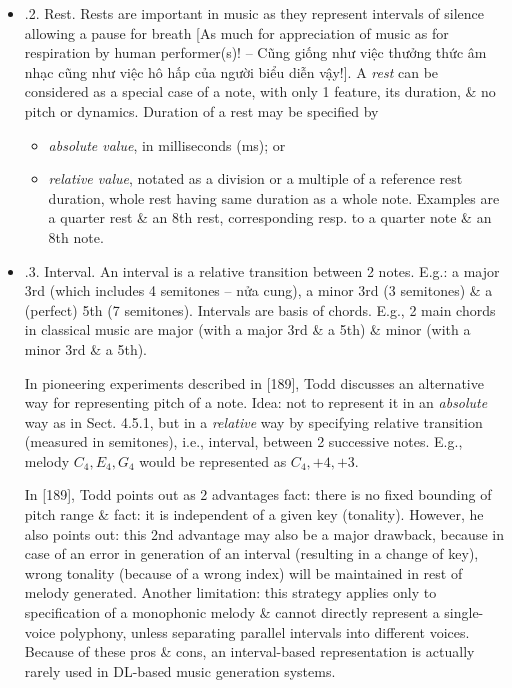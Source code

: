 \documentclass{article}
\begin{document}
\begin{itemize}
\begin{itemize}
\begin{itemize}
\begin{itemize}
\begin{enumerate}
				\end{enumerate}
			\end{itemize}
			\item {.2. Rest.} Rests are important in music as they represent intervals of silence allowing a pause for breath [As much for appreciation of music as for respiration by human performer(s)! -- Cũng giống như việc thưởng thức âm nhạc cũng như việc hô hấp của người biểu diễn vậy!]. A {\it rest} can be considered as a special case of a note, with only 1 feature, its duration, \& no pitch or dynamics. Duration of a rest may be specified by
			\begin{itemize}
				\item {\it absolute value}, in milliseconds (ms); or
				\item {\it relative value}, notated as a division or a multiple of a reference rest duration, whole rest having same duration as a whole note. Examples are a quarter rest \& an 8th rest, corresponding resp. to a quarter note \& an 8th note.
			\end{itemize}
			\item {.3. Interval.} An interval is a relative transition between 2 notes. E.g.: a major 3rd (which includes 4 semitones -- nửa cung), a minor 3rd (3 semitones) \& a (perfect) 5th (7 semitones). Intervals are basis of chords. E.g., 2 main chords in classical music are major (with a major 3rd \& a 5th) \& minor (with a minor 3rd \& a 5th).

			In pioneering experiments described in [189], {\sc Todd} discusses an alternative way for representing pitch of a note. Idea: not to represent it in an {\it absolute} way as in Sect. 4.5.1, but in a {\it relative} way by specifying relative transition (measured in semitones), i.e., interval, between 2 successive notes. E.g., melody $C_4,E_4,G_4$ would be represented as $C_4,+4,+3$.

			In [189], {\sc Todd} points out as 2 advantages fact: there is no fixed bounding of pitch range \& fact: it is independent of a given key (tonality). However, he also points out: this 2nd advantage may also be a major drawback, because in case of an error in generation of an interval (resulting in a change of key), wrong tonality (because of a wrong index) will be maintained in rest of melody generated. Another limitation: this strategy applies only to specification of a monophonic melody \& cannot directly represent a single-voice polyphony, unless separating parallel intervals into different voices. Because of these pros \& cons, an interval-based representation is actually rarely used in DL-based music generation systems.


\end{itemize}
\end{itemize}
\end{itemize}
\end{document}
